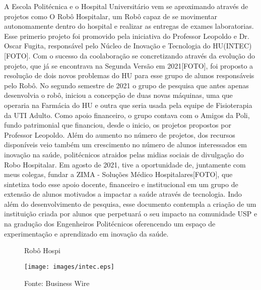 \documentclass[../poliXuniversity_hospital_(USP)_report.tex]{subfiles}
\begin{document}
A Escola Politécnica e o Hospital Universitário vem se aproximando através de projetos como O Robô Hospitalar, um Robô capaz de se movimentar autonomamente dentro do hospital e realizar as entregas de exames laboratorias. Esse primerio projeto foi promovido pela iniciativa do Professor Leopoldo e Dr. Oscar Fugita, responsável pelo Núcleo de Inovação e Tecnologia do HU(INTEC)[FOTO]. Com o sucesso da coolaboração se concretizando através da evolução do projeto, que já se encontrava na Segunda Versão em 2021[FOTO], foi proposto a resolução de dois novos problemas do HU para esse grupo de alunos responsáveis pelo Robô. No segundo semestre de 2021 o grupo de pesquisa que antes apenas desenvolvia o robô, iniciou a concepção de duas novas máquinas, uma que operaria na Farmácia do HU e outra que seria usada pela equipe de Fisioterapia da UTI Adulto. Como apoio financeiro, o grupo contava com o Amigos da Poli, fundo patrimonial que financiou, desde o inicio, os projetos propostos por Professor Leopoldo. Além do aumento no número de projetos, dos recursos disponíveis veio também um crescimento no número de alunos interessados em inovação na saúde, politécnicos atraidos pelas midias sociais de divulgação do Robo Hospitalar. Em agosto de 2021, tive a oportunidade de, juntamente com meus colegas, fundar a ZIMA - Soluções Médico Hospitalares[FOTO], que sintetiza todo esse apoio docente, financeiro e institucional em um grupo de extensão de alunos motivados a impactar a saúde através de tecnologia. Indo além do desenvolvimento de pesquisa, esse documento contempla a criação de um instituição criada por alunos que perpetuará o seu impacto na comunidade USP e na gradução dos Engenheiros Politécnicos oferencendo um espaço de experimentação e aprendizado em inovação da saúde.
\begin{figure}[h]
\centering
    \caption{Robô Hospi}
    \centering %
    \texttt{[image: images/intec.eps]}
    \caption*{Fonte: Business Wire}
    \label{fig: Robô Hospi}
\end{figure}
\end{document}
